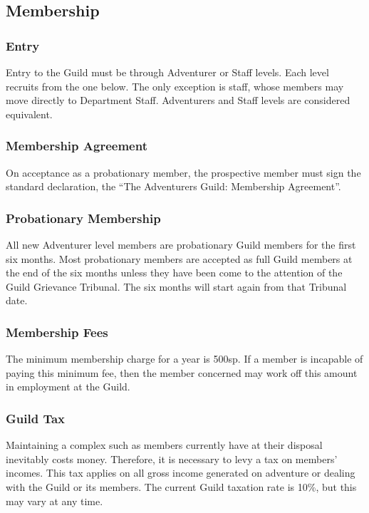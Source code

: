 \documentclass[twoside,a4paper]{article}
\begin{document}
\begin{multicols}{2}
\begin{description}
\end{description}

\subsection{Membership}

\subsubsection{Entry}

Entry to the Guild must be through Adventurer or Staff levels. Each
level recruits from the one below. The only exception is staff, whose
members may move directly to Department Staff. Adventurers and Staff
levels are considered equivalent.

\subsubsection{Membership Agreement}

On acceptance as a probationary member, the prospective member must
sign the standard declaration, the ``The Adventurers Guild: Membership
Agreement''.

\subsubsection{Probationary Membership}

All new Adventurer level members are probationary Guild members for
the first six months. Most probationary members are accepted as full
Guild members at the end of the six months unless they have been come
to the attention of the Guild Grievance Tribunal.  The six months will
start again from that Tribunal date.

\subsubsection{Membership Fees}

The minimum membership charge for a year is 500sp. If a member is
incapable of paying this minimum fee, then the member concerned may
work off this amount in employment at the Guild.

\subsubsection{Guild Tax}

Maintaining a complex such as members currently have at their disposal
inevitably costs money. Therefore, it is necessary to levy a tax on
members' incomes. This tax applies on all gross income generated on
adventure or dealing with the Guild or its members.  The current Guild
taxation rate is 10\%, but this may vary at any time.


\end{multicols}
\end{document}
